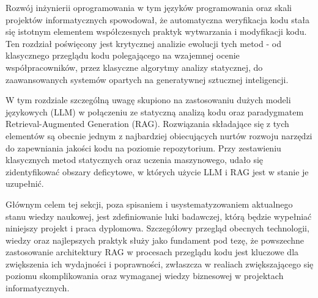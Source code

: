 Rozwój inżynierii oprogramowania w tym języków programowania oraz skali projektów informatycznych spowodował, że
automatyczna weryfikacja kodu stała się istotnym elementem współczesnych praktyk wytwarzania i modyfikacji kodu.
Ten rozdział poświęcony jest krytycznej analizie ewolucji tych metod - od klasycznego przeglądu kodu polegającego na
wzajemnej ocenie współpracowników, przez klasyczne algorytmy analizy statycznej, do zaawansowanych systemów opartych na
generatywnej sztucznej inteligencji.

W tym rozdziale szczególną uwagę skupiono na zastosowaniu dużych modeli językowych (LLM) w połączeniu ze
statyczną analizą kodu oraz paradygmatem Retrieval-Augmented Generation (RAG). Rozwiązania składające się z tych elementów
są obecnie jednym z najbardziej obiecujących nurtów rozwoju narzędzi do zapewniania jakości kodu na poziomie repozytorium.
Przy zestawieniu klasycznych metod statycznych oraz uczenia maszynowego, udało się zidentyfikować
obszary deficytowe, w których użycie LLM i RAG jest w stanie je uzupełnić.

Głównym celem tej sekcji, poza spisaniem i usystematyzowaniem aktualnego stanu wiedzy naukowej, jest
zdefiniowanie luki badawczej, którą będzie wypełniać niniejszy projekt i praca dyplomowa.
Szczegółowy przegląd obecnych technologii, wiedzy oraz najlepszych praktyk służy jako fundament pod tezę, że
powszechne zastosowanie architektury RAG w procesach przeglądu kodu jest kluczowe dla zwiększenia ich wydajności i
poprawności, zwłaszcza w realiach zwiększającego się poziomu skomplikowania oraz wymaganej wiedzy biznesowej w projektach
informatycznych.
